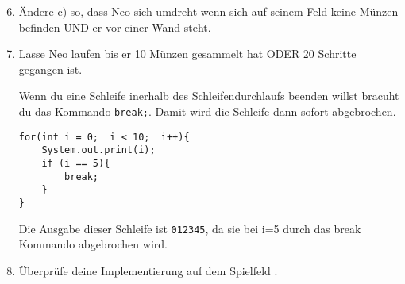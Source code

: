 \begin{enumerate}\setcounter{enumi}{5}
	\item
		Ändere c) so, dass Neo sich umdreht wenn sich auf seinem Feld keine Münzen befinden UND er vor einer Wand steht.

	\item
		Lasse Neo laufen bis er 10 Münzen gesammelt hat ODER 20 Schritte gegangen ist.

		\begin{Infobox}[Break]
			Wenn du eine Schleife inerhalb des Schleifendurchlaufs beenden willst bracuht du das Kommando \lstinline{break;}. 
			Damit wird die Schleife dann sofort abgebrochen.

			\begin{lstlisting}
for(int i = 0;  i < 10;  i++){
	System.out.print(i);
	if (i == 5){
		break;
	}
}
			\end{lstlisting}

			Die Ausgabe dieser Schleife ist \lstinline{012345}, da sie bei i=5 durch das break Kommando abgebrochen wird.
		\end{Infobox}

	\item
		Überprüfe deine Implementierung auf dem Spielfeld .
\end{enumerate}
\newpage
